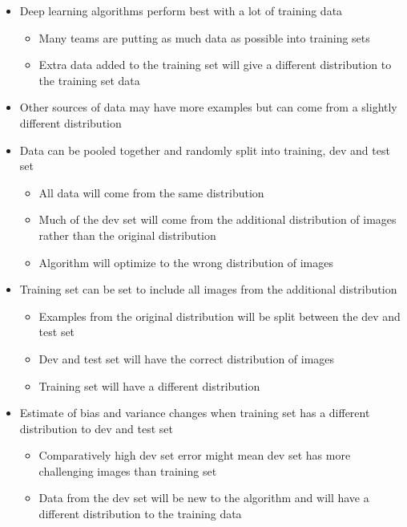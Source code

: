 \documentclass[12pt, letterpaper]{article}
\begin{document}
    \begin{itemize}
        \item Deep learning algorithms perform best with a lot of training data
        \begin{itemize}
            \item Many teams are putting as much data as possible into training sets
            \item Extra data added to the training set will give a different distribution to the training set data
        \end{itemize}
        \item Other sources of data may have more examples but can come from a slightly different distribution
        \item Data can be pooled together and randomly split into training, dev and test set
        \begin{itemize}
            \item All data will come from the same distribution
            \item Much of the dev set will come from the additional distribution of images rather than the original distribution
            \item Algorithm will optimize to the wrong distribution of images
        \end{itemize}
        \item Training set can be set to include all images from the additional distribution
        \begin{itemize}
            \item Examples from the original distribution will be split between the dev and test set
            \item Dev and test set will have the correct distribution of images
            \item Training set will have a different distribution 
        \end{itemize}
        \item Estimate of bias and variance changes when training set has a different distribution to dev and test set
        \begin{itemize}
            \item Comparatively high dev set error might mean dev set has more challenging images than training set
            \item Data from the dev set will be new to the algorithm and will have a different distribution to the training data
        \end{itemize}

\end{itemize}
\end{document}
